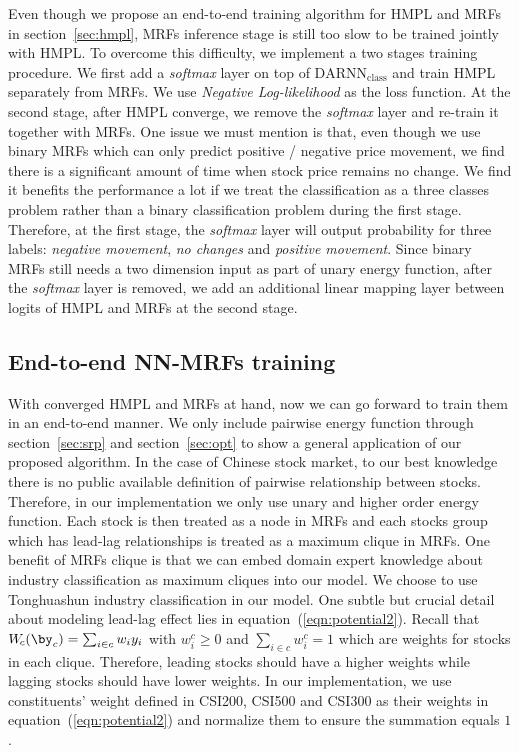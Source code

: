 \documentclass[sigconf]{acmart}
\renewcommand{\cite}{\citep}
\begin{document}
Even though we propose an end-to-end training algorithm for HMPL
and MRFs in section~\ref{sec:hmpl}, MRFs inference stage is still
too slow to be trained jointly with HMPL. To overcome this
difficulty, we implement a two stages training procedure. We
first add a \emph{softmax} layer on top of
$\text{DARNN}_{\text{class}}$ and train HMPL separately from
MRFs. We use \emph{Negative Log-likelihood} as the loss function.
At the second stage, after HMPL converge, we remove the
\emph{softmax} layer and re-train it together with MRFs. One
issue we must mention is that, even though we use binary MRFs
which can only predict positive / negative price movement, we
find there is a significant amount of time when stock price
remains no change. We find it benefits the performance a lot if
we treat the classification as a three classes problem rather
than a binary classification problem during the first stage.
Therefore, at the first stage, the \emph{softmax} layer will
output probability for three labels: \emph{negative movement},
\emph{no changes} and \emph{positive movement}. Since binary MRFs
still needs a two dimension input as part of unary energy
function, after the \emph{softmax} layer is removed, we add an
additional linear mapping layer between logits of HMPL and MRFs
at the second stage.

\subsection{End-to-end NN-MRFs training}
\label{sec:mrf_train}

With converged HMPL and MRFs at hand, now we can go forward to train
them in an end-to-end manner. We only include pairwise energy function through
section~\ref{sec:srp} and section~\ref{sec:opt} to show a general
application of our proposed algorithm. In the case of Chinese
stock market, to our best knowledge there is no public available
definition of pairwise relationship between stocks. Therefore, in
our implementation we only use unary and higher order energy
function. Each stock is then treated as a node in MRFs and each
stocks group which has lead-lag relationships is treated as a
maximum clique in MRFs. One benefit of MRFs clique is that we can
embed domain expert knowledge about industry classification as
maximum cliques into our model. We choose to use Tonghuashun
industry classification \cite{ths} in our model. One subtle but
crucial detail about modeling lead-lag effect lies in
equation~(\ref{eqn:potential2}). Recall that $W_{\!c}(\by_c) =
\sum_{i \in c} w_i y_i$ with $w^c_i \geq 0$ and $\sum_{i \in c}
w^c_i = 1$ which are weights for stocks in each clique.
Therefore, leading stocks should have a higher weights while
lagging stocks should have lower weights. In our implementation,
we use constituents' weight defined in CSI200, CSI500 and CSI300
as their weights in equation~(\ref{eqn:potential2}) and normalize
them to ensure the summation equals $1$.
\end{document}

